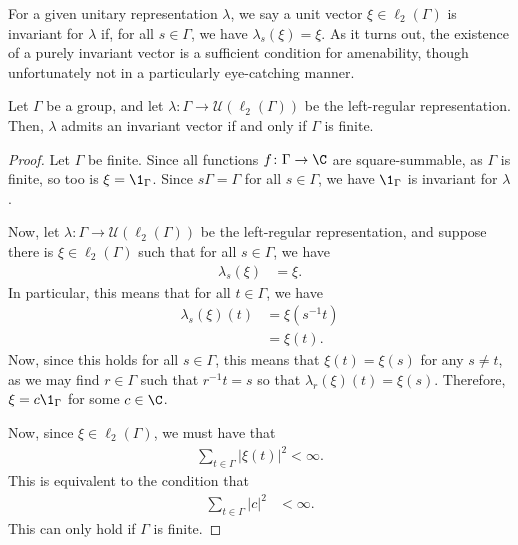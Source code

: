 For a given unitary representation $\lambda$, we say a unit vector $\xi\in\ell_2\left( \Gamma \right)$ is invariant for $\lambda$ if, for all $s\in\Gamma$, we have $\lambda_s\left( \xi \right) = \xi$. As it turns out, the existence of a purely invariant vector is a sufficient condition for amenability, though unfortunately not in a particularly eye-catching manner.

\begin{theorem}
  Let $\Gamma$ be a group, and let $\lambda\colon \Gamma\rightarrow \mathcal{U}\left( \ell_2\left( \Gamma \right) \right)$ be the left-regular representation. Then, $\lambda$ admits an invariant vector if and only if $\Gamma$ is finite.
\end{theorem}
\begin{proof}
  Let $\Gamma$ be finite. Since all functions $f\colon \Gamma\rightarrow \C$ are square-summable, as $\Gamma$ is finite, so too is $\xi = \1_{\Gamma}$. Since $s\Gamma = \Gamma$ for all $s\in\Gamma$, we have $\1_{\Gamma}$ is invariant for $\lambda$.\newline

  Now, let $\lambda\colon \Gamma\rightarrow \mathcal{U}\left( \ell_2\left( \Gamma \right) \right)$ be the left-regular representation, and suppose there is $\xi\in \ell_2\left( \Gamma \right)$ such that for all $s\in\Gamma$, we have
  \begin{align*}
    \lambda_s\left( \xi \right) &= \xi.
  \end{align*}
  In particular, this means that for all $t\in\Gamma$, we have
  \begin{align*}
    \lambda_s\left( \xi \right)\left( t \right) &= \xi\left( s^{-1}t \right)\\
                                                &= \xi\left( t \right).
  \end{align*}
  Now, since this holds for all $s\in\Gamma$, this means that $\xi\left( t \right) = \xi\left( s \right)$ for any $s\neq t$, as we may find $r\in \Gamma$ such that $r^{-1}t = s$ so that $\lambda_r\left( \xi \right)\left( t \right) = \xi\left( s \right)$. Therefore, $\xi = c\1_{\Gamma}$ for some $c\in\C$.\newline

  Now, since $\xi\in \ell_2\left( \Gamma \right)$, we must have that
  \begin{align*}
    \sum_{t\in\Gamma}\left\vert \xi(t) \right\vert^2 < \infty.
  \end{align*}
  This is equivalent to the condition that
  \begin{align*}
    \sum_{t\in\Gamma}\left\vert c \right\vert^2 &< \infty.
  \end{align*}
  This can only hold if $\Gamma$ is finite.
\end{proof}

